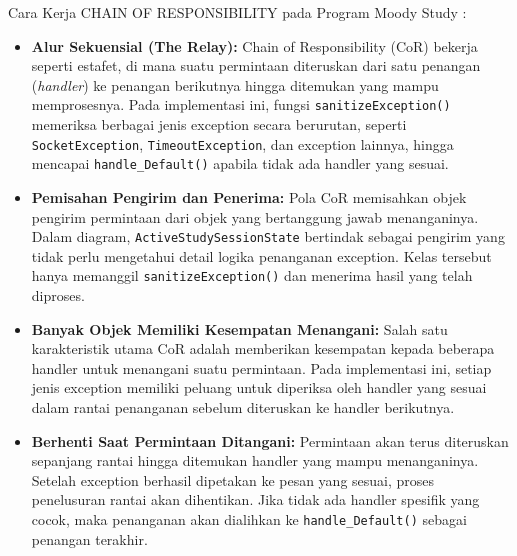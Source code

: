 \documentclass[11pt]{article}
\begin{document}
Cara Kerja CHAIN OF RESPONSIBILITY pada Program Moody Study :
\begin{itemize}

\item \textbf{Alur Sekuensial (The Relay):} Chain of Responsibility (CoR) bekerja seperti estafet, di mana suatu permintaan diteruskan dari satu penangan (\textit{handler}) ke penangan berikutnya hingga ditemukan yang mampu memprosesnya. Pada implementasi ini, fungsi \texttt{sanitizeException()} memeriksa berbagai jenis exception secara berurutan, seperti \texttt{SocketException}, \texttt{TimeoutException}, dan exception lainnya, hingga mencapai \texttt{handle\_Default()} apabila tidak ada handler yang sesuai.

\item \textbf{Pemisahan Pengirim dan Penerima:} Pola CoR memisahkan objek pengirim permintaan dari objek yang bertanggung jawab menanganinya. Dalam diagram, \texttt{ActiveStudySessionState} bertindak sebagai pengirim yang tidak perlu mengetahui detail logika penanganan exception. Kelas tersebut hanya memanggil \texttt{sanitizeException()} dan menerima hasil yang telah diproses.

\item \textbf{Banyak Objek Memiliki Kesempatan Menangani:} Salah satu karakteristik utama CoR adalah memberikan kesempatan kepada beberapa handler untuk menangani suatu permintaan. Pada implementasi ini, setiap jenis exception memiliki peluang untuk diperiksa oleh handler yang sesuai dalam rantai penanganan sebelum diteruskan ke handler berikutnya.

\item \textbf{Berhenti Saat Permintaan Ditangani:} Permintaan akan terus diteruskan sepanjang rantai hingga ditemukan handler yang mampu menanganinya. Setelah exception berhasil dipetakan ke pesan yang sesuai, proses penelusuran rantai akan dihentikan. Jika tidak ada handler spesifik yang cocok, maka penanganan akan dialihkan ke \texttt{handle\_Default()} sebagai penangan terakhir.

\end{itemize}
\end{document}
